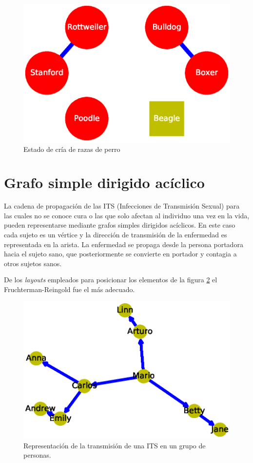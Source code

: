 \documentclass{article}
\begin{document}
\begin{figure}
  \includegraphics[width=.8\columnwidth]{fig3.eps}
  \vspace*{-10mm}
  \caption{Estado de cría de razas de perro}
  \label{Figura 3}
\end{figure}



\section{Grafo simple dirigido acíclico}

La cadena de propagación de las ITS (Infecciones de Transmisión Sexual) para las cuales no se conoce cura o las que solo afectan al individuo una vez en la vida, pueden representarse mediante grafos simples dirigidos acíclicos. En este caso cada sujeto es un vértice y la dirección de transmisión de la enfermedad es representada en la arista. La enfermedad se propaga desde la persona portadora hacia el sujeto sano, que posteriormente se convierte en portador y contagia a otros sujetos sanos.

De los \textit{layouts} empleados para posicionar los elementos de la figura \ref{Figura 4} el Fruchterman-Reingold fue el más adecuado.

\begin{figure}
  \includegraphics[width=.8\columnwidth]{fig4.eps}
  \vspace*{-12mm}
  \caption{Representación de la transmisión de una ITS en un grupo de personas.}
  \label{Figura 4}
\end{figure}
\newpage

\end{document}
